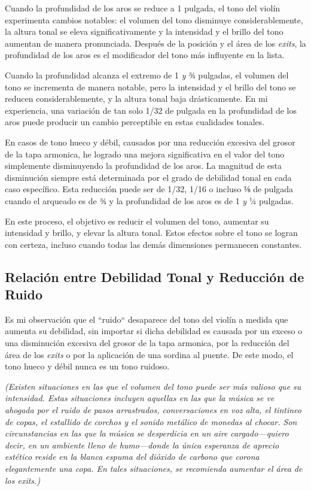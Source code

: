 \documentclass[12pt]{book}
\begin{document}
Cuando la profundidad de los aros se reduce a 1 pulgada, el tono del violín experimenta cambios notables: el volumen del tono disminuye considerablemente, la altura tonal se eleva significativamente y la intensidad y el brillo del tono aumentan de manera pronunciada. Después de la posición y el área de los \textit{exits}, la profundidad de los aros es el modificador del tono más influyente en la lista.

Cuando la profundidad alcanza el extremo de 1 \textit{y} ¾ pulgadas, el volumen del tono se incrementa de manera notable, pero la intensidad y el brillo del tono se reducen considerablemente, y la altura tonal baja drásticamente. En mi experiencia, una variación de tan solo 1/32 de pulgada en la profundidad de los aros puede producir un cambio perceptible en estas cualidades tonales.

En casos de tono hueco y débil, causados por una reducción excesiva del grosor de la tapa armonica, he logrado una mejora significativa en el valor del tono simplemente disminuyendo la profundidad de los aros. La magnitud de esta disminución siempre está determinada por el grado de debilidad tonal en cada caso específico. Esta reducción puede ser de 1/32, 1/16 o incluso ⅛ de pulgada cuando el arqueado es de ¾ y la profundidad de los aros es de 1 \textit{y} ¼ pulgadas. 

En este proceso, el objetivo es reducir el volumen del tono, aumentar su intensidad y brillo, y elevar la altura tonal. Estos efectos sobre el tono se logran con certeza, incluso cuando todas las demás dimensiones permanecen constantes.

\subsection*{Relación entre Debilidad Tonal y Reducción de Ruido}

Es mi observación que el ``ruido`` desaparece del tono del violín a medida que aumenta su debilidad, sin importar si dicha debilidad es causada por un exceso o una disminución excesiva del grosor de la tapa armonica, por la reducción del área de los \textit{exits} o por la aplicación de una sordina al puente. De este modo, el tono hueco y débil nunca es un tono ruidoso.

\textit{(Existen situaciones en las que el volumen del tono puede ser más valioso que su intensidad. Estas situaciones incluyen aquellas en las que la música se ve ahogada por el ruido de pasos arrastrados, conversaciones en voz alta, el tintineo de copas, el estallido de corchos y el sonido metálico de monedas al chocar. Son circunstancias en las que la música se desperdicia en un aire cargado—quiero decir, en un ambiente lleno de humo—donde la única esperanza de aprecio estético reside en la blanca espuma del dióxido de carbono que corona elegantemente una copa. En tales situaciones, se recomienda aumentar el área de los \textit{exits}.)}
\end{document}
